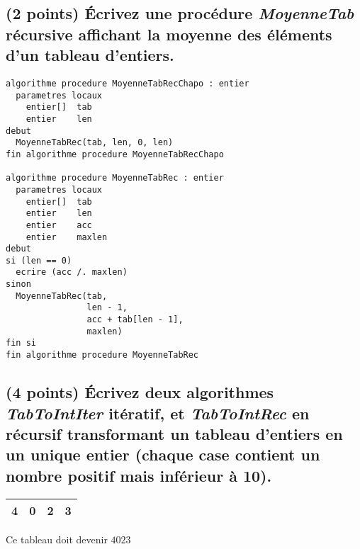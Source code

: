 \documentclass[11pt,a4paper]{article}
\begin{document}

\vfillLast
\newpage
\vfillFirst


\subsection{(2 points) \'Ecrivez une procédure \og \textit{MoyenneTab} \fg{} récursive affichant la moyenne des éléments d'un tableau d'entiers. }

\bigskip

\begin{center}

\begin{lstlisting}[style=algorithmique]
algorithme procedure MoyenneTabRecChapo : entier
  parametres locaux
    entier[]  tab
    entier    len
debut
  MoyenneTabRec(tab, len, 0, len)
fin algorithme procedure MoyenneTabRecChapo

algorithme procedure MoyenneTabRec : entier
  parametres locaux
    entier[]  tab
    entier    len
    entier    acc
    entier    maxlen
debut
si (len == 0)
  ecrire (acc /. maxlen)
sinon
  MoyenneTabRec(tab,
                len - 1,
                acc + tab[len - 1],
                maxlen)
fin si
fin algorithme procedure MoyenneTabRec \end{lstlisting}

\end{center}



\vfillLast
\newpage

\subsection{(4 points) \'Ecrivez deux algorithmes \og \textit{TabToIntIter} \fg{} itératif, et \og \textit{TabToIntRec} \fg{} en récursif transformant un tableau d'entiers en un unique entier (chaque case contient un nombre positif mais inférieur à 10). }

\medskip

\begin{center}
  \begin{tabular}{| c | c | c | c |}
    \hline
    4 & 0 & 2 & 3 \\
    \hline
  \end{tabular}

  \smallskip

  Ce tableau doit devenir $ 4023 $
\end{center}

\medskip
\end{document}
